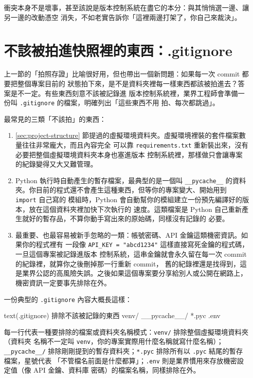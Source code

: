 衝突本身不是壞事，甚至該說是版本控制系統在盡它的本分：與其悄悄選一邊、讓另一邊的改動憑空
消失，不如老實告訴你「這裡兩邊打架了，你自己來裁決」。

\section{不該被拍進快照裡的東西：.gitignore}
\label{sec:gitignore}

上一節的「拍照存證」比喻很好用，但也帶出一個新問題：如果每一次 commit 都要把整個專案目前的
狀態拍下來，是不是資料夾裡每一樣東西都該被拍進去？答案是不一定。有些東西刻意不該被記錄進
版本控制系統裡，業界工程師會準備一份叫 \texttt{.gitignore} 的檔案，明確列出「這些東西不用
拍、每次都跳過」。

最常見的三類「不該拍」的東西：

\begin{enumerate}
\item \ref{sec:project-structure} 節提過的虛擬環境資料夾。虛擬環境裡裝的套件檔案數量往往非常龐大，而且內容完全
可以靠 \texttt{requirements.txt} 重新裝出來，沒有必要把整個虛擬環境資料夾本身也塞進版本
控制系統裡，那樣做只會讓專案的紀錄變得又大又難管理。
\item Python 執行時自動產生的暫存檔案，最典型的是一個叫 \texttt{\_\_pycache\_\_} 的資料
夾。你目前的程式還不會產生這種東西，但等你的專案變大、開始用到 \texttt{import} 自己寫的
模組時，Python 會自動幫你的模組建立一份預先編譯好的版本，放在這個資料夾裡加快下次執行的
速度。這類檔案是 Python 自己重新產生就好的暫存品，不算你動手寫出來的原始碼，同樣沒有記錄的
必要。
\item 最重要、也最容易被新手忽略的一類：帳號密碼、API 金鑰這類機密資訊。如果你的程式裡有
一段像 \texttt{API\_KEY = "abcd1234"} 這樣直接寫死金鑰的程式碼，一旦這個專案被記錄進版本
控制系統，這串金鑰就會永久留在每一次 commit 的紀錄裡，就算你之後刪掉那一行重新 commit，
舊的紀錄裡還是找得到，這是業界公認的高風險失誤。之後如果這個專案要分享給別人或公開在網路上，
機密資訊一定要事先排除在外。
\end{enumerate}

一份典型的 \texttt{.gitignore} 內容大概長這樣：

\begin{code}{text}{(.gitignore) 排除不該被記錄的東西}
venv/
__pycache__/
*.pyc
.env
\end{code}

每一行代表一種要排除的檔案或資料夾名稱模式：\texttt{venv/} 排除整個虛擬環境資料夾（資料夾
名稱不一定叫 \texttt{venv}，你的專案實際用什麼名稱就寫什麼名稱）；\texttt{\_\_pycache\_\_/}
排除剛剛提到的暫存資料夾；\texttt{*.pyc} 排除所有以 \texttt{.pyc} 結尾的暫存檔案，星號代表
「不管檔名前面是什麼都算」；\texttt{.env} 則是業界慣用來存放機密設定值（像 API 金鑰、資料庫
密碼）的檔案名稱，同樣排除在外。

